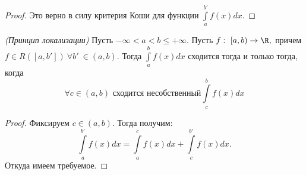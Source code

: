 \begin{proof}
    Это верно в силу критерия Коши для функции $\int \limits_a^{b'} f(x) dx.$
\end{proof}

\begin{theorem}
    \textit{(Принцип локализации)} Пусть $-\infty < a < b \leq +\infty.$ Пусть $f: \ [a, b) \rightarrow \R,$ причем $f \in R([a, b']) \ \forall b' \  \in (a, b).$ Тогда $\int \limits_a^b f(x) dx$ сходится тогда и только тогда, когда 
    $$\forall c \in (a, b) \text{ сходится несобственный} \int \limits_c^b f(x) dx $$
\end{theorem}

\begin{proof}
    Фиксируем $c \in (a, b).$ Тогда получим:
    $$\int \limits_a^{b'} f(x) dx = \int \limits_a^c f(x) dx + \int \limits_c^{b'} f(x) dx.$$
    Откуда имеем требуемое.
\end{proof}